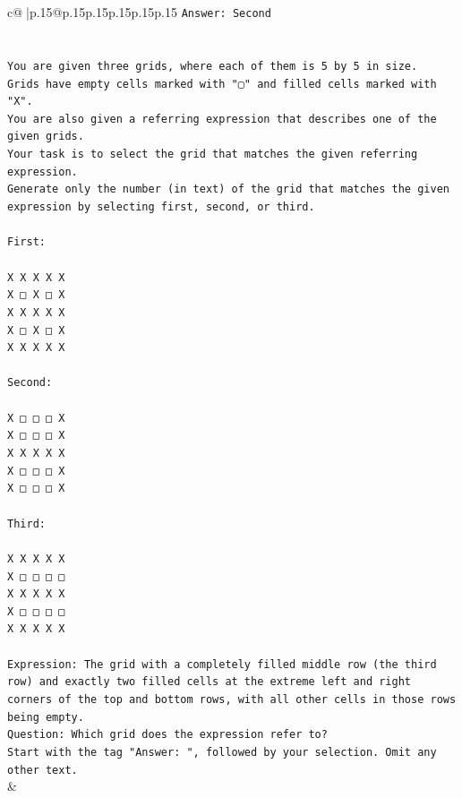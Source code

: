 \documentclass{article}
\begin{document}
{\begin{supertabular}{c@{$\;$}|p{.15\linewidth}@{}p{.15\linewidth}p{.15\linewidth}p{.15\linewidth}p{.15\linewidth}p{.15\linewidth}}
{{{\texttt{Answer: Second} \\
\\ 
\\ 
\texttt{You are given three grids, where each of them is 5 by 5 in size.} \\
\texttt{Grids have empty cells marked with "▢" and filled cells marked with "X".} \\
\texttt{You are also given a referring expression that describes one of the given grids.} \\
\texttt{Your task is to select the grid that matches the given referring expression.} \\
\texttt{Generate only the number (in text) of the grid that matches the given expression by selecting first, second, or third.} \\
\\ 
\texttt{First:} \\
\\ 
\texttt{X X X X X} \\
\texttt{X □ X □ X} \\
\texttt{X X X X X} \\
\texttt{X □ X □ X} \\
\texttt{X X X X X} \\
\\ 
\texttt{Second:} \\
\\ 
\texttt{X □ □ □ X} \\
\texttt{X □ □ □ X} \\
\texttt{X X X X X} \\
\texttt{X □ □ □ X} \\
\texttt{X □ □ □ X} \\
\\ 
\texttt{Third:} \\
\\ 
\texttt{X X X X X} \\
\texttt{X □ □ □ □} \\
\texttt{X X X X X} \\
\texttt{X □ □ □ □} \\
\texttt{X X X X X} \\
\\ 
\texttt{Expression: The grid with a completely filled middle row (the third row) and exactly two filled cells at the extreme left and right corners of the top and bottom rows, with all other cells in those rows being empty.} \\
\texttt{Question: Which grid does the expression refer to?} \\
\texttt{Start with the tag "Answer: ", followed by your selection. Omit any other text.} \\
            }
        }
    }
    & \\ \\


\end{supertabular}}
\end{document}
